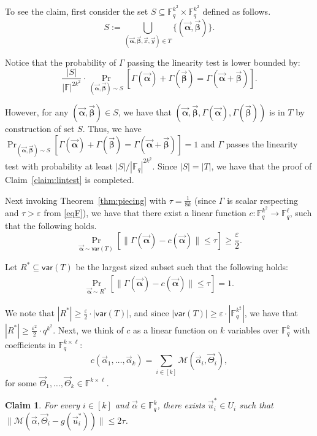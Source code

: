 \documentclass[11pt]{article}
\newcommand{\F}{\mathbb{F}}
\renewcommand{\ge}{ \geqslant}
\renewcommand{\le}{ \leqslant}
\newtheorem{claim}[theorem]{Claim}
\newcommand{\alphab}{\vec{\bm{\alpha}}}
\newcommand{\betab}{\vec{\bm{\beta}}}
\newcommand{\var}{\mathsf{var}}
\renewcommand{\kappa}{\tau}
\newcommand{\M}{\mathcal{M}}
\begin{document}
To see the claim, first consider the set $S\subseteq \F_q^{k^2}\times \F_q^{k^2}$ defined as follows.
$$
S:=\underset{(\alphab,\betab,\vec{x},\vec{y})\in T}{\bigcup}\{(\alphab,\betab)\}.
$$  

Notice that the probability of $\Gamma$ passing the linearity test is lower bounded by:
$$
\frac{|S|}{|\F|^{2k^2}}\cdot \Pr_{(\vec{\bm{\alpha}},\vec{\bm{\beta}})\sim S}\left[\Gamma(\vec{\bm{\alpha}})+\Gamma(\vec{\bm{\beta}})=\Gamma(\vec{\bm{\alpha}}+\vec{\bm{\beta}})\right].
$$
 
However, for any $(\alphab,\betab)\in S$, we have that $(\alphab,\betab,\Gamma(\alphab),\Gamma(\betab))$ is in $T$ by construction of set $S$.  Thus, we have $\Pr_{(\vec{\bm{\alpha}},\vec{\bm{\beta}})\sim S}\left[\Gamma(\vec{\bm{\alpha}})+\Gamma(\vec{\bm{\beta}})=\Gamma(\vec{\bm{\alpha}}+\vec{\bm{\beta}})\right]=1$ and $\Gamma$ passes the linearity test with probability at least $|S|/|\F_q|^{2k^2}$. Since $|S|=|T|$, we have that the proof of Claim~\ref{claim:lintest} is completed. 
	



Next invoking Theorem~\ref{thm:piecing} with $\kappa=\frac{1}{8k}$ (since $\Gamma$ is scalar respecting and $\kappa> \varepsilon$ from \eqref{eqF}), we have that there exist a linear function $c:\F_q^{k^2}\to\F_q^{\ell}$, such that the following holds.
$$
\underset{\vec{\bm{\alpha}}\sim \var(T) }{\Pr}\left[\|\Gamma(\vec{\bm{\alpha}})-c(\vec{\bm{\alpha}})\|\le \kappa  \right]\ge \frac{\varepsilon}{2}.
$$ 

Let $R^\ast\subseteq \var(T)$ be the largest sized subset such that the following holds:
\begin{align}
\underset{\vec{\bm{\alpha}}\sim R^\ast }{\Pr}\left[\|\Gamma(\vec{\bm{\alpha}})-c(\vec{\bm{\alpha}})\|\le \kappa  \right]=1
.\label{eq:lin1}
\end{align}

We note that $|R^\ast|\ge \frac{\varepsilon}{2}\cdot |\var(T)|$, and since $|\var(T)|\ge \varepsilon\cdot |\F_q^{k^2}|$, we have that $|R^\ast|\ge \frac{\varepsilon^2}{2}\cdot q^{k^2}$.  
Next, we think of $c$ as a linear function on $k$ variables over $\F_q^k$ with coefficients  in $\F_q^{k\times \ell}$:
$$c(\vec{\alpha}_1,\ldots ,\vec{\alpha}_k)=\sum_{i\in[k]}\M(\vec{\alpha}_i,\vec{\Theta}_i ),$$ 
for some $\vec{\Theta}_1 ,\ldots ,\vec{\Theta}_k \in\mathbb{F}^{k\times \ell}$.


\begin{claim}\label{claim:decodespecificalpha}
For every $i\in[k]$ and $\vec{\alpha}\in\F_q^k$, there exists $\vec{u}_i^\ast\in U_i$  such that $\|\M(  \vec{\alpha},\vec{\Theta}_i-g(\vec{u}_i^\ast)) \|\le 2\kappa$.
\end{claim}
\end{document}
